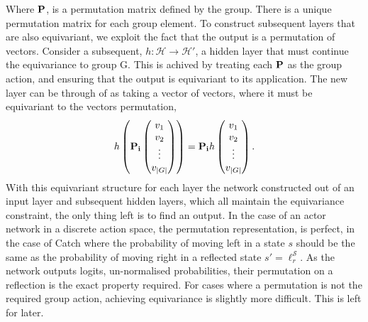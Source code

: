 Where $\mathbf{P}$, is a permutation matrix defined by the group. There is a unique permutation matrix for each group element. To construct subsequent layers that are also equivariant, we exploit the fact that the output is a permutation of vectors. Consider a subsequent, $h: \mathcal{H} \rightarrow \mathcal{H}'$, a hidden layer that must continue the equivariance to group G. This is achived by treating each $\mathbf{P}$ as the group action, and ensuring that the output is equivariant to its application. The new layer can be through of as taking a vector of vectors, where it must be equivariant to the vectors permutation,
\begin{equation}
	h\left( \mathbf{P_i}
	\begin{pmatrix}
		v_1    \\
		v_2    \\
		\vdots \\
		v_{|G|}
	\end{pmatrix}
	\right) = \mathbf{P_i} h
	\begin{pmatrix}
		v_1    \\
		v_2    \\
		\vdots \\
		v_{|G|}
	\end{pmatrix}.
\end{equation}
With this equivariant structure for each layer the network constructed out of an input layer and subsequent hidden layers, which all maintain the equivariance constraint, the only thing left is to find an output. In the case of an actor network in a discrete action space, the permutation representation, is perfect, in the case of Catch where the probability of moving left in a state $s$ should be the same as the probability of moving right in a reflected state $s' = \ell_r^\mathcal{S}$. As the network outputs logits, un-normalised probabilities, their permutation on a reflection is the exact property required. For cases where a permutation is not the required group action, achieving equivariance is slightly more difficult. This is left for later.


